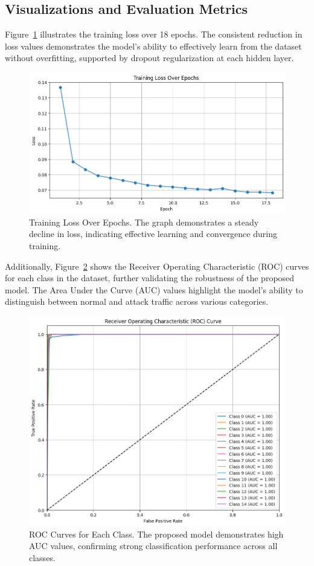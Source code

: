 \documentclass[conference]{IEEEtran}
\begin{document}
\subsection{Visualizations and Evaluation Metrics}
Figure~\ref{fig:training_loss} illustrates the training loss over 18 epochs. The consistent reduction in loss values demonstrates the model's ability to effectively learn from the dataset without overfitting, supported by dropout regularization at each hidden layer.

\begin{figure}[ht]
    \centering
    \includegraphics[width=0.8\linewidth]{2.png}
    \caption{Training Loss Over Epochs. The graph demonstrates a steady decline in loss, indicating effective learning and convergence during training.}
    \label{fig:training_loss}
\end{figure}

Additionally, Figure~\ref{fig:roc_curve} shows the Receiver Operating Characteristic (ROC) curves for each class in the dataset, further validating the robustness of the proposed model. The Area Under the Curve (AUC) values highlight the model's ability to distinguish between normal and attack traffic across various categories.

\begin{figure}[ht]
    \centering
    \includegraphics[width=0.8\linewidth]{3.png}
    \caption{ROC Curves for Each Class. The proposed model demonstrates high AUC values, confirming strong classification performance across all classes.}
    \label{fig:roc_curve}
\end{figure}
\end{document}
